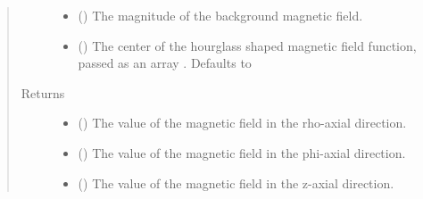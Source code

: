 \documentclass[letterpaper,10pt,english]{sphinxmanual}
\begin{document}
\begin{fulllineitems}
\begin{quote}
\begin{description}
\begin{itemize}
\item {} 
 () \textendash{} The magnitude of the background magnetic field.

\item {} 
 () \textendash{} The center of the hourglass shaped magnetic field function, passed
as an array \sphinxcode{\sphinxupquote{{[}r0,phi0,z0{]}}}. Defaults to \sphinxcode{\sphinxupquote{{[}0,0,0{]}}}

\end{itemize}

\item[{Returns}] \leavevmode
\begin{itemize}
\item {} 
 () \textendash{} The value of the magnetic field in the rho-axial direction.

\item {} 
 () \textendash{} The value of the magnetic field in the phi-axial direction.

\item {} 
 () \textendash{} The value of the magnetic field in the z-axial direction.

\end{itemize}


\end{description}\end{quote}

\end{fulllineitems}

\end{document}
